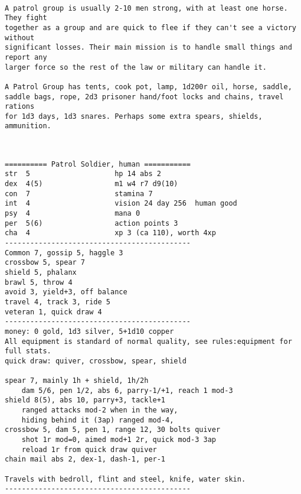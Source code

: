 \

\goodbreak \begin{samepage} \small \begin{verbatim}
A patrol group is usually 2-10 men strong, with at least one horse. They fight 
together as a group and are quick to flee if they can't see a victory without 
significant losses. Their main mission is to handle small things and report any 
larger force so the rest of the law or military can handle it.

A Patrol Group has tents, cook pot, lamp, 1d200r oil, horse, saddle, 
saddle bags, rope, 2d3 prisoner hand/foot locks and chains, travel rations 
for 1d3 days, 1d3 snares. Perhaps some extra spears, shields, ammunition.
\end{verbatim} \normalsize \end{samepage}

\

\goodbreak \begin{samepage} \small \begin{verbatim}
========== Patrol Soldier, human ===========
str  5                    hp 14 abs 2
dex  4(5)                 m1 w4 r7 d9(10)
con  7                    stamina 7
int  4                    vision 24 day 256  human good
psy  4                    mana 0
per  5(6)                 action points 3
cha  4                    xp 3 (ca 110), worth 4xp
--------------------------------------------
Common 7, gossip 5, haggle 3
crossbow 5, spear 7
shield 5, phalanx
brawl 5, throw 4
avoid 3, yield+3, off balance
travel 4, track 3, ride 5
veteran 1, quick draw 4
--------------------------------------------
money: 0 gold, 1d3 silver, 5+1d10 copper
All equipment is standard of normal quality, see rules:equipment for full stats.
quick draw: quiver, crossbow, spear, shield

spear 7, mainly 1h + shield, 1h/2h
    dam 5/6, pen 1/2, abs 6, parry-1/+1, reach 1 mod-3
shield 8(5), abs 10, parry+3, tackle+1
    ranged attacks mod-2 when in the way,
    hiding behind it (3ap) ranged mod-4,
crossbow 5, dam 5, pen 1, range 12, 30 bolts quiver
    shot 1r mod=0, aimed mod+1 2r, quick mod-3 3ap
    reload 1r from quick draw quiver
chain mail abs 2, dex-1, dash-1, per-1

Travels with bedroll, flint and steel, knife, water skin.
--------------------------------------------
\end{verbatim} \normalsize \end{samepage}

\









